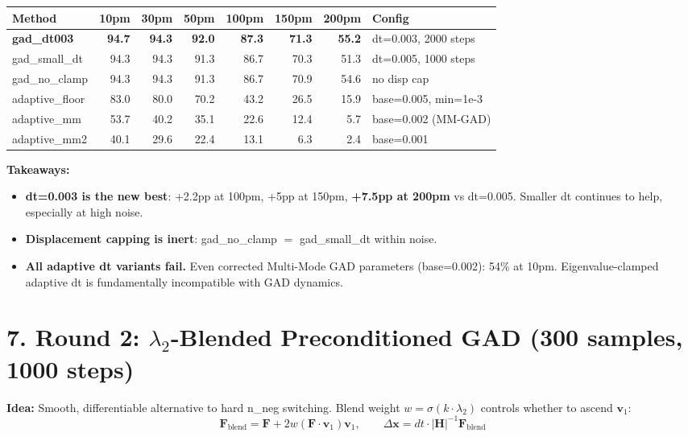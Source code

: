 \documentclass[11pt]{article}
\begin{document}
\begin{tabular}{l*{6}{r}l}
\toprule
Method & 10pm & 30pm & 50pm & 100pm & 150pm & 200pm & Config \\
\midrule
\textbf{gad\_dt003} & \textbf{94.7} & \textbf{94.3} & \textbf{92.0} & \textbf{87.3} & \textbf{71.3} & \textbf{55.2} & dt=0.003, 2000 steps \\
gad\_small\_dt      & 94.3 & 94.3 & 91.3 & 86.7 & 70.3 & 51.3 & dt=0.005, 1000 steps \\
gad\_no\_clamp      & 94.3 & 94.3 & 91.3 & 86.7 & 70.9 & 54.6 & no disp cap \\
adaptive\_floor     & 83.0 & 80.0 & 70.2 & 43.2 & 26.5 & 15.9 & base=0.005, min=1e-3 \\
adaptive\_mm        & 53.7 & 40.2 & 35.1 & 22.6 & 12.4 & 5.7 & base=0.002 (MM-GAD) \\
adaptive\_mm2       & 40.1 & 29.6 & 22.4 & 13.1 & 6.3 & 2.4 & base=0.001 \\
\bottomrule
\end{tabular}

\textbf{Takeaways:}
\begin{itemize}[nosep,leftmargin=1.5em]
\item \textbf{dt=0.003 is the new best}: +2.2pp at 100pm, +5pp at 150pm, \textbf{+7.5pp at 200pm} vs dt=0.005.
      Smaller dt continues to help, especially at high noise.
\item \textbf{Displacement capping is inert}: gad\_no\_clamp $=$ gad\_small\_dt within noise.
\item \textbf{All adaptive dt variants fail.} Even corrected Multi-Mode GAD parameters (base=0.002): 54\% at 10pm.
      Eigenvalue-clamped adaptive dt is fundamentally incompatible with GAD dynamics.
\end{itemize}

\section*{7. Round 2: $\lambda_2$-Blended Preconditioned GAD \small(300 samples, 1000 steps)}

\textbf{Idea:} Smooth, differentiable alternative to hard n\_neg switching. Blend weight
$w = \sigma(k \cdot \lambda_2)$ controls whether to ascend $\mathbf{v}_1$:
\[
\mathbf{F}_{\text{blend}} = \mathbf{F} + 2w(\mathbf{F}\cdot\mathbf{v}_1)\mathbf{v}_1, \qquad
\Delta\mathbf{x} = dt \cdot |\mathbf{H}|^{-1} \mathbf{F}_{\text{blend}}
\]
\end{document}
